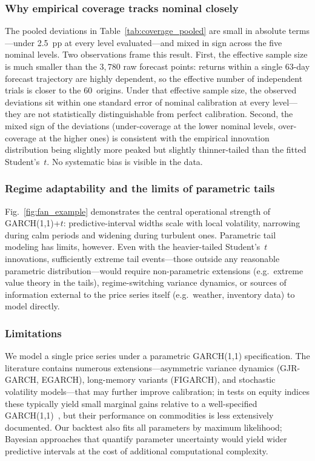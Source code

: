 \documentclass[journal]{IEEEtran}
\begin{document}
\subsubsection{Why empirical coverage tracks nominal closely}
The pooled deviations in Table~\ref{tab:coverage_pooled} are small in
absolute terms---under 2.5~pp at every level evaluated---and mixed in
sign across the five nominal levels.  Two observations frame this
result.  First, the effective sample size is much smaller than the
$3{,}780$ raw forecast points: returns within a single 63-day forecast
trajectory are highly dependent, so the effective number of independent
trials is closer to the 60~origins.  Under that effective sample size,
the observed deviations sit within one standard error of nominal
calibration at every level---they are not statistically distinguishable
from perfect calibration.  Second, the mixed sign of the deviations
(under-coverage at the lower nominal levels, over-coverage at the
higher ones) is consistent with the empirical innovation distribution
being slightly more peaked but slightly thinner-tailed than the fitted
Student's~$t$.  No systematic bias is visible in the data.

\subsubsection{Regime adaptability and the limits of parametric tails}
Fig.~\ref{fig:fan_example} demonstrates the central operational strength
of GARCH(1,1)+$t$: predictive-interval widths scale with local
volatility, narrowing during calm periods and widening during turbulent
ones.  Parametric tail modeling has limits, however.  Even with the
heavier-tailed Student's~$t$ innovations, sufficiently extreme tail
events---those outside any reasonable parametric distribution---would
require non-parametric extensions (e.g.\ extreme value theory in the
tails), regime-switching variance dynamics, or sources of information
external to the price series itself (e.g.\ weather, inventory data) to
model directly.

\subsubsection{Limitations}
We model a single price series under a parametric GARCH(1,1) specification.
The literature contains numerous extensions---asymmetric variance dynamics
(GJR-GARCH, EGARCH), long-memory variants (FIGARCH), and stochastic
volatility models---that may further improve calibration; in tests on
equity indices these typically yield small marginal gains relative to a
well-specified GARCH(1,1)~\cite{hansenlunde2005}, but their performance on
commodities is less extensively documented.  Our backtest also fits all
parameters by maximum likelihood; Bayesian approaches that quantify
parameter uncertainty would yield wider predictive intervals at the cost
of additional computational complexity.
\end{document}

